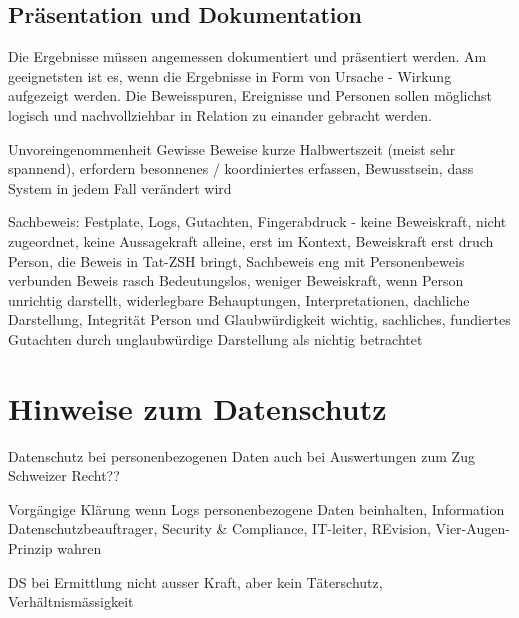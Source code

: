 \subsection{Präsentation und Dokumentation}
Die Ergebnisse müssen angemessen dokumentiert und präsentiert werden. Am geeignetsten ist es, wenn die Ergebnisse in Form von Ursache - Wirkung aufgezeigt werden. Die Beweisspuren, Ereignisse und Personen sollen möglichst logisch und nachvollziehbar in Relation zu einander gebracht werden.





Unvoreingenommenheit
Gewisse Beweise kurze Halbwertszeit (meist sehr spannend), erfordern besonnenes / koordiniertes erfassen, Bewusstsein, dass System in jedem Fall verändert wird

Sachbeweis: Festplate, Logs, Gutachten, Fingerabdruck - keine Beweiskraft, nicht zugeordnet, keine Aussagekraft alleine, erst im Kontext, Beweiskraft erst druch Person, die Beweis in Tat-ZSH bringt, Sachbeweis eng mit Personenbeweis verbunden
Beweis rasch Bedeutungslos, weniger Beweiskraft, wenn Person unrichtig darstellt, widerlegbare Behauptungen, Interpretationen, dachliche Darstellung, Integrität Person und Glaubwürdigkeit wichtig, sachliches, fundiertes Gutachten durch unglaubwürdige Darstellung als nichtig betrachtet

\section{Hinweise zum Datenschutz}
Datenschutz bei personenbezogenen Daten auch bei Auswertungen zum Zug
Schweizer Recht??

Vorgängige Klärung wenn Logs personenbezogene Daten beinhalten, Information Datenschutzbeauftrager, Security \& Compliance, IT-leiter, REvision, Vier-Augen-Prinzip wahren

DS bei Ermittlung nicht ausser Kraft, aber kein Täterschutz, Verhältnismässigkeit
